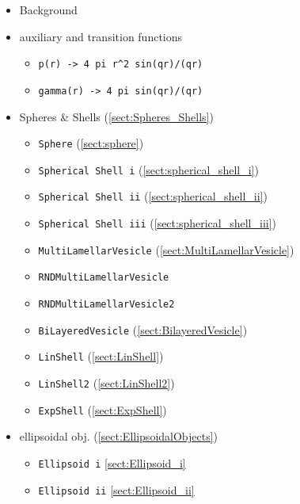 \begin{itemize}
\item Background
\item auxiliary and transition functions
\begin{itemize}
  \item \texttt{p(r) -> 4 pi r\^{}2 sin(qr)/(qr)}
  \item \texttt{gamma(r) -> 4 pi sin(qr)/(qr)}
\end{itemize}
\item Spheres \& Shells (\ref{sect:Spheres_Shells})
\begin{itemize}
\item \texttt{Sphere} (\ref{sect:sphere})
\item \texttt{Spherical Shell i} (\ref{sect:spherical_shell_i})
\item \texttt{Spherical Shell ii} (\ref{sect:spherical_shell_ii})
\item \texttt{Spherical Shell iii} (\ref{sect:spherical_shell_iii})
\item \texttt{MultiLamellarVesicle} (\ref{sect:MultiLamellarVesicle})
\item \texttt{RNDMultiLamellarVesicle}
\item \texttt{RNDMultiLamellarVesicle2}
\item \texttt{BiLayeredVesicle} (\ref{sect:BilayeredVesicle})
\item \texttt{LinShell} (\ref{sect:LinShell})
\item \texttt{LinShell2} (\ref{sect:LinShell2})
\item \texttt{ExpShell} (\ref{sect:ExpShell})
\end{itemize}
\item ellipsoidal obj. (\ref{sect:EllipsoidalObjects})
\begin{itemize}
\item \texttt{Ellipsoid i} \ref{sect:Ellipsoid_i}
\item \texttt{Ellipsoid ii} \ref{sect:Ellipsoid_ii}

\end{itemize}
\end{itemize}
